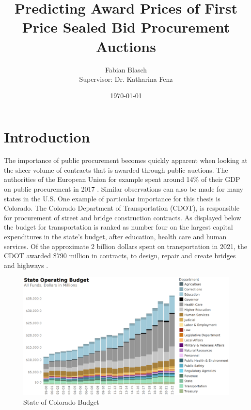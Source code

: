 \documentclass[a4paper,12pt, headsepline]{scrartcl}
\title{Predicting Award Prices of First Price Sealed Bid Procurement Auctions}
\date{\today}
\author{Fabian Blasch\\[0.4cm]{Supervisor: Dr. Katharina Fenz}}
\numberwithin{equation}{section}
\begin{document}
\begin{titlingpage}
\maketitle
\end{titlingpage}
\newpage
\tableofcontents
\thispagestyle{empty}
\clearpage
{} 

\section{Introduction}\label{sec:int}
The importance of public procurement becomes quickly apparent when looking at the sheer volume of contracts that is awarded through public auctions. The authorities of the European Union for example spent around 14\% of their GDP on public procurement in 2017 \citep{GarciaRodriguez2020}. Similar observations can also be made for many states in the U.S. One example of particular importance for this thesis is Colorado. The Colorado Department of Transportation (CDOT), is responsible for procurement of street and bridge construction contracts. As displayed below the budget for transportation is ranked as number four on the largest capital expenditures in the state's budget, after education, health care and human services. Of the approximate 2 billion dollars spent on transportation in 2021, the CDOT awarded \$790 million in contracts, to design, repair and create bridges and highways \citep{CDOTPRes}.

\begin{figure}[H]
	\includegraphics[width = 14	cm]{figures/Colorado_Budget.PNG}
	\caption{State of Colorado Budget}\label{fig:bud}
\end{figure}
\end{document}
